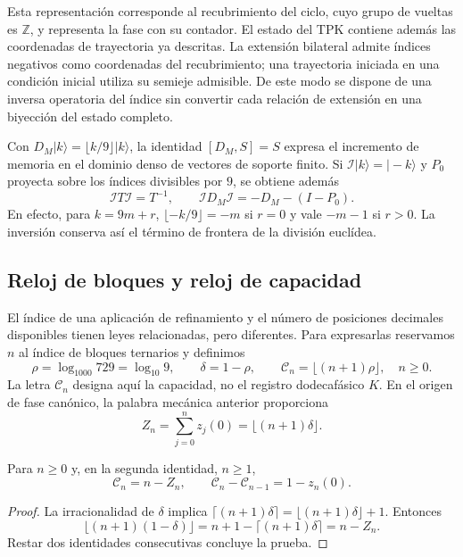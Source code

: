 Esta representación corresponde al recubrimiento del ciclo, cuyo grupo
de vueltas es \(\mathbb Z\), y representa la fase con su contador. El
estado del TPK contiene además las coordenadas de trayectoria ya descritas.
La extensión bilateral admite índices negativos como coordenadas del
recubrimiento; una trayectoria iniciada en una condición inicial utiliza
su semieje admisible. De este modo se dispone de una inversa operatoria
del índice sin convertir cada relación de extensión en una biyección del
estado completo.

Con \(D_M|k\rangle=\lfloor k/9\rfloor|k\rangle\), la identidad
\([D_M,S]=S\) expresa el incremento de memoria en el dominio denso de
vectores de soporte finito. Si \(\mathcal I|k\rangle=|-k\rangle\) y
\(P_0\) proyecta sobre los índices divisibles por \(9\), se obtiene
además
\begin{equation}
 \mathcal I T\mathcal I=T^{-1},\qquad
 \mathcal I D_M\mathcal I=-D_M-(I-P_0).
 \label{mono-ampl:inversion-contador}
\end{equation}
En efecto, para \(k=9m+r\),
\(\lfloor-k/9\rfloor=-m\) si \(r=0\) y vale \(-m-1\) si \(r>0\).
La inversión conserva así el término de frontera de la división euclídea.

\subsection{Reloj de bloques y reloj de capacidad}
\label{mono-ampl:relojes}

El índice de una aplicación de refinamiento y el número de posiciones
decimales disponibles tienen leyes relacionadas, pero diferentes. Para
expresarlas reservamos \(n\) al índice de bloques ternarios y definimos
\[
 \rho=\log_{1000}729=\log_{10}9,\qquad
 \delta=1-\rho,\qquad
 \mathcal C_n=\lfloor(n+1)\rho\rfloor,\quad n\geq0.
\]
La letra \(\mathcal C_n\) designa aquí la capacidad, no el registro
dodecafásico \(K\). En el origen de fase canónico, la palabra mecánica
anterior proporciona
\[
 Z_n=\sum_{j=0}^{n}z_j(0)=\lfloor(n+1)\delta\rfloor.
\]

\begin{proposition}
\label{mono-ampl:balance-capacidad}
Para \(n\geq0\) y, en la segunda identidad, \(n\geq1\),
\[
 \mathcal C_n=n-Z_n,\qquad
 \mathcal C_n-\mathcal C_{n-1}=1-z_n(0).
\]
\end{proposition}
\begin{proof}
La irracionalidad de \(\delta\) implica
\(\lceil(n+1)\delta\rceil=\lfloor(n+1)\delta\rfloor+1\).
Entonces
\[
 \lfloor(n+1)(1-\delta)\rfloor
 =n+1-\lceil(n+1)\delta\rceil=n-Z_n.
\]
Restar dos identidades consecutivas concluye la prueba.
\end{proof}

